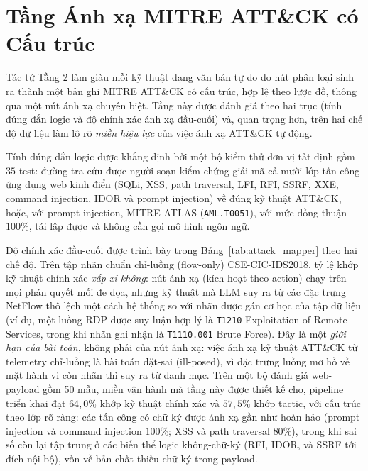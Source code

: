 \section{Tầng Ánh xạ MITRE ATT\&CK có Cấu trúc}
Tác tử Tầng 2 làm giàu mỗi kỹ thuật dạng văn bản tự do do nút phân loại sinh ra thành một bản ghi MITRE ATT\&CK có cấu trúc, hợp lệ theo lược đồ, thông qua một nút ánh xạ chuyên biệt. Tầng này được đánh giá theo hai trục (tính đúng đắn logic và độ chính xác ánh xạ đầu-cuối) và, quan trọng hơn, trên hai chế độ dữ liệu làm lộ rõ \emph{miền hiệu lực} của việc ánh xạ ATT\&CK tự động.

Tính đúng đắn logic được khẳng định bởi một bộ kiểm thử đơn vị tất định gồm $35$ test: đường tra cứu được người soạn kiểm chứng giải mã cả mười lớp tấn công ứng dụng web kinh điển (SQLi, XSS, path traversal, LFI, RFI, SSRF, XXE, command injection, IDOR và prompt injection) về đúng kỹ thuật ATT\&CK, hoặc, với prompt injection, MITRE ATLAS (\texttt{AML.T0051}), với mức đồng thuận $100\%$, tái lập được và không cần gọi mô hình ngôn ngữ.

Độ chính xác đầu-cuối được trình bày trong Bảng~\ref{tab:attack_mapper} theo hai chế độ. Trên tập nhãn chuẩn chỉ-luồng (flow-only) CSE-CIC-IDS2018, tỷ lệ khớp kỹ thuật chính xác \emph{xấp xỉ không}: nút ánh xạ (kích hoạt theo action) chạy trên mọi phán quyết mối đe dọa, nhưng kỹ thuật mà LLM suy ra từ các đặc trưng NetFlow thô lệch một cách hệ thống so với nhãn được gán cơ học của tập dữ liệu (ví dụ, một luồng RDP được suy luận hợp lý là \texttt{T1210} Exploitation of Remote Services, trong khi nhãn ghi nhận là \texttt{T1110.001} Brute Force). Đây là một \emph{giới hạn của bài toán}, không phải của nút ánh xạ: việc ánh xạ kỹ thuật ATT\&CK từ telemetry chỉ-luồng là bài toán đặt-sai (ill-posed), vì đặc trưng luồng mơ hồ về mặt hành vi còn nhãn thì suy ra từ danh mục. Trên một bộ đánh giá web-payload gồm 50 mẫu, miền vận hành mà tầng này được thiết kế cho, pipeline triển khai đạt $64{,}0\%$ khớp kỹ thuật chính xác và $57{,}5\%$ khớp tactic, với cấu trúc theo lớp rõ ràng: các tấn công có chữ ký được ánh xạ gần như hoàn hảo (prompt injection và command injection $100\%$; XSS và path traversal $80\%$), trong khi sai số còn lại tập trung ở các biến thể logic không-chữ-ký (RFI, IDOR, và SSRF tới đích nội bộ), vốn về bản chất thiếu chữ ký trong payload.

